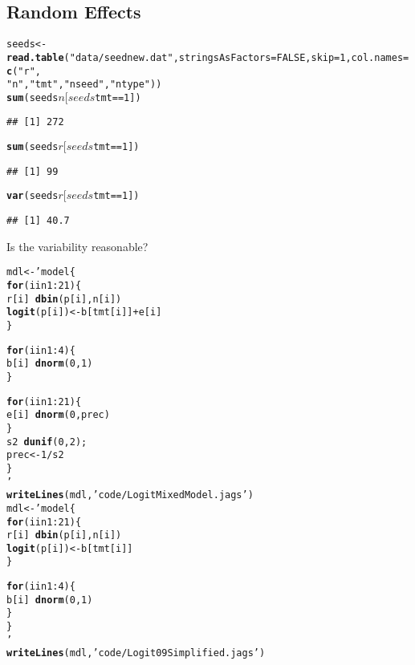 \documentclass[12pt,letterpaper,oneside]{article}\usepackage{graphicx, color}
\makeatletter
\newcommand{\hlfunctioncall}[1]{\textcolor[rgb]{0.501960784313725,0,0.329411764705882}{\textbf{#1}}}%
\newcommand{\hlstring}[1]{\textcolor[rgb]{0.6,0.6,1}{#1}}%
\newenvironment{kframe}{%
 \def\at@end@of@kframe{}%
 \ifinner\ifhmode%
  \def\at@end@of@kframe{\end{minipage}}%
  \begin{minipage}{\columnwidth}%
 \fi\fi%
 \def\FrameCommand##1{\hskip\@totalleftmargin \hskip-\fboxsep
 \colorbox{shadecolor}{##1}\hskip-\fboxsep
     \hskip-\linewidth \hskip-\@totalleftmargin \hskip\columnwidth}%
 \MakeFramed {\advance\hsize-\width
   \@totalleftmargin\z@ \linewidth\hsize
   \@setminipage}}%
 {\par\unskip\endMakeFramed%
 \at@end@of@kframe}
\newenvironment{knitrout}{}{} %
\makeatother
\begin{document}
\subsection{Random Effects} %
\label{sub:random_effects}
\begin{knitrout}\scriptsize
{}\color{fgcolor}\begin{kframe}
\begin{alltt}
seeds <- \hlfunctioncall{read.table}(\hlstring{"data/seednew.dat"}, stringsAsFactors = FALSE, skip = 1, col.names = \hlfunctioncall{c}(\hlstring{"r"}, 
    \hlstring{"n"}, \hlstring{"tmt"}, \hlstring{"nseed"}, \hlstring{"ntype"}))
\hlfunctioncall{sum}(seeds$n[seeds$tmt == 1])
\end{alltt}
\begin{verbatim}
## [1] 272
\end{verbatim}
\begin{alltt}
\hlfunctioncall{sum}(seeds$r[seeds$tmt == 1])
\end{alltt}
\begin{verbatim}
## [1] 99
\end{verbatim}
\begin{alltt}

\hlfunctioncall{var}(seeds$r[seeds$tmt == 1])
\end{alltt}
\begin{verbatim}
## [1] 40.7
\end{verbatim}
\end{kframe}
\end{knitrout}

Is the variability reasonable?

\begin{knitrout}\scriptsize
{}\color{fgcolor}\begin{kframe}
\begin{alltt}
mdl <- 'model \{
    \hlfunctioncall{for} (i in 1:21) \{
        r[i] ~ \hlfunctioncall{dbin}(p[i], n[i])
        \hlfunctioncall{logit}(p[i]) <- b[tmt[i]] + e[i]
    \}

    \hlfunctioncall{for} (i in 1:4) \{
        b[i] ~ \hlfunctioncall{dnorm}(0, 1)
    \}

    \hlfunctioncall{for} (i in 1:21) \{
        e[i] ~ \hlfunctioncall{dnorm}(0, prec)
    \}
    s2 ~ \hlfunctioncall{dunif}(0,2);
    prec <- 1/s2
\}
'
\hlfunctioncall{writeLines}(mdl, \hlstring{'code/LogitMixedModel.jags'})
mdl <- 'model \{
    \hlfunctioncall{for} (i in 1:21) \{
        r[i] ~ \hlfunctioncall{dbin}(p[i], n[i])
        \hlfunctioncall{logit}(p[i]) <- b[tmt[i]]
    \}

    \hlfunctioncall{for} (i in 1:4) \{
        b[i] ~ \hlfunctioncall{dnorm}(0, 1)
    \}
\}
'
\hlfunctioncall{writeLines}(mdl, \hlstring{'code/Logit09Simplified.jags'})
\end{alltt}
\end{kframe}
\end{knitrout}
\end{document}
